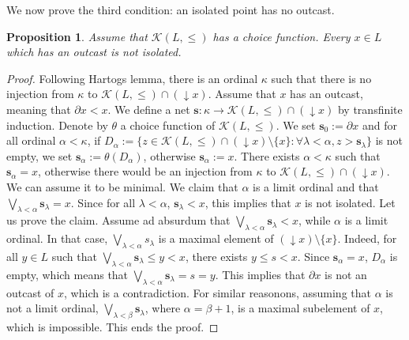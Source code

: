 \documentclass{article}
\newcommand{\blue}{\color{blue}}
\newtheorem{proposition}[theorem]{Proposition}
\begin{document}

{We now prove the third condition: an isolated point has no outcast.}

\begin{proposition}\label{prop.no.outcast.rev}
    Assume that $\mathcal{K}(L,\le)$ has a choice function. Every $x \in L$ which has an outcast is not isolated.
\end{proposition}

\begin{proof}
     Following Hartogs lemma, there is an ordinal $\kappa$ such that 
    there is no injection from $\kappa$ to $\mathcal{K}(L,\le)\cap (\mathop{\downarrow} x)$. Assume that $x$ has an outcast, meaning that $\partial x < x$. We define a net $\boldsymbol{s} : \kappa \rightarrow \mathcal{K}(L,\le)\cap (\mathop{\downarrow} x)$ by transfinite induction. Denote by $\theta$ a choice function of $\mathcal{K}(L,\le)$. We set $\boldsymbol{s}_0 := \partial x$ and 
    for all ordinal $\alpha < \kappa$, if $D_{\alpha} := \{z \in \mathcal{K}(L,\le) \cap (\downarrow x) \setminus \{x\} : \forall \lambda < \alpha, z > \boldsymbol{s}_{\lambda}\}$ is not empty, we set 
    $\boldsymbol{s}_{\alpha} := \theta(D_{\alpha})$,
    otherwise $\boldsymbol{s}_{\alpha} := x$. There exists $\alpha < \kappa$ such that $\boldsymbol{s}_{\alpha} = x$, otherwise there would be an injection from $\kappa$ to $\mathcal{K}(L,\le)\cap (\downarrow x)$.
    We can assume it to be minimal. We claim that $\alpha$ is a limit ordinal and that $\bigvee_{\lambda < \alpha} \boldsymbol{s}_{\lambda}= x$. Since for all $\lambda < \alpha$, $\boldsymbol{s}_{\lambda} < x$, this implies that $x$ is not isolated.
    Let us prove the claim. Assume ad absurdum that $\bigvee_{\lambda < \alpha} \boldsymbol{s}_{\lambda} < x$, while $\alpha$ is a limit ordinal. In that case, 
    $\bigvee_{\lambda < \alpha} s_{\lambda}$ is a maximal element of $(\mathop{\downarrow}x) \setminus \{x\}$. 
    {Indeed, for all $y \in L$ such that 
    $\bigvee_{\lambda < \alpha} \boldsymbol{s}_{\lambda} \le y < x$,
    there exists $y \le s < x$. Since $\boldsymbol{s}_\alpha = x$, $D_{\alpha}$ is empty, which means that  
    $\bigvee_{\lambda < \alpha} \boldsymbol{s}_{\lambda} = s = y$. 
    This implies that $\partial x$ is not an outcast of $x$, which is a contradiction. 
    For similar reasonons, assuming that $\alpha$ is not a limit ordinal, $\bigvee_{\lambda < \beta} \boldsymbol{s}_{\lambda}$, where $\alpha = \beta +1$, is a maximal subelement of $x$, which is impossible. This ends the proof.} 
\end{proof}
\end{document}
